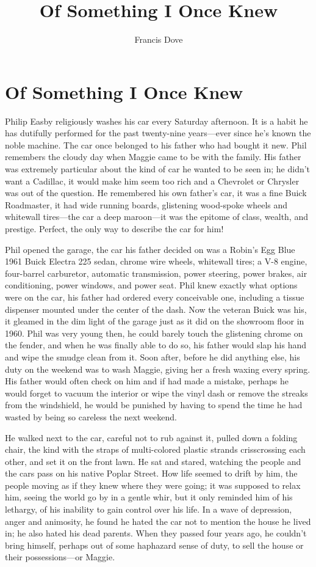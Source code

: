 \documentclass[
]{article}
\title{Of Something I Once Knew}
\author{Francis Dove}
\date{}
\begin{document}
\maketitle

\section{Of Something I Once Knew}\label{of-something-i-once-knew}

Philip Easby religiously washes his car every Saturday afternoon. It is
a habit he has dutifully performed for the past twenty-nine years---ever
since he's known the noble machine. The car once belonged to his father
who had bought it new. Phil remembers the cloudy day when Maggie came to
be with the family. His father was extremely particular about the kind
of car he wanted to be seen in; he didn't want a Cadillac, it would make
him seem too rich and a Chevrolet or Chrysler was out of the question.
He remembered his own father's car, it was a fine Buick Roadmaster, it
had wide running boards, glistening wood-spoke wheels and whitewall
tires---the car a deep maroon---it was the epitome of class, wealth, and
prestige. Perfect, the only way to describe the car for him!

Phil opened the garage, the car his father decided on was a Robin's Egg
Blue 1961 Buick Electra 225 sedan, chrome wire wheels, whitewall tires;
a V-8 engine, four-barrel carburetor, automatic transmission, power
steering, power brakes, air conditioning, power windows, and power seat.
Phil knew exactly what options were on the car, his father had ordered
every conceivable one, including a tissue dispenser mounted under the
center of the dash. Now the veteran Buick was his, it gleamed in the dim
light of the garage just as it did on the showroom floor in 1960. Phil
was very young then, he could barely touch the glistening chrome on the
fender, and when he was finally able to do so, his father would slap his
hand and wipe the smudge clean from it. Soon after, before he did
anything else, his duty on the weekend was to wash Maggie, giving her a
fresh waxing every spring. His father would often check on him and if
had made a mistake, perhaps he would forget to vacuum the interior or
wipe the vinyl dash or remove the streaks from the windshield, he would
be punished by having to spend the time he had wasted by being so
careless the next weekend.

He walked next to the car, careful not to rub against it, pulled down a
folding chair, the kind with the straps of multi-colored plastic strands
crisscrossing each other, and set it on the front lawn. He sat and
stared, watching the people and the cars pass on his native Poplar
Street. How life seemed to drift by him, the people moving as if they
knew where they were going; it was supposed to relax him, seeing the
world go by in a gentle whir, but it only reminded him of his lethargy,
of his inability to gain control over his life. In a wave of depression,
anger and animosity, he found he hated the car not to mention the house
he lived in; he also hated his dead parents. When they passed four years
ago, he couldn't bring himself, perhaps out of some haphazard sense of
duty, to sell the house or their possessions---or Maggie.
\end{document}
